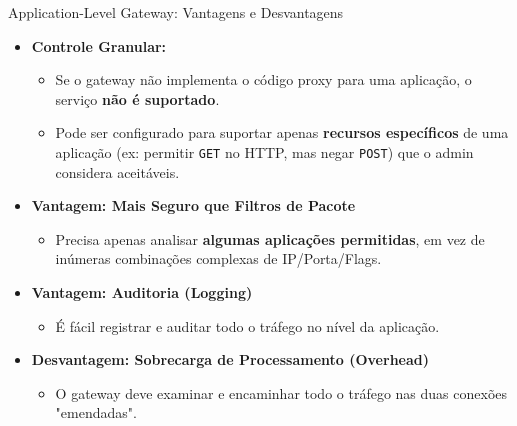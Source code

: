 \begin{frame}{Application-Level Gateway: Vantagens e Desvantagens}
    \begin{itemize}
        \item \textbf{Controle Granular:}
              \begin{itemize}
                  \item Se o gateway não implementa o código proxy para uma aplicação, o serviço \textbf{não é suportado}.
                  \item Pode ser configurado para suportar apenas \textbf{recursos específicos} de uma aplicação (ex: permitir \texttt{GET} no HTTP, mas negar \texttt{POST}) que o admin considera aceitáveis.
              \end{itemize}

        \item \textbf{Vantagem: Mais Seguro que Filtros de Pacote}
              \begin{itemize}
                  \item Precisa apenas analisar \textbf{algumas aplicações permitidas}, em vez de inúmeras combinações complexas de IP/Porta/Flags.
              \end{itemize}

        \item \textbf{Vantagem: Auditoria (Logging)}
              \begin{itemize}
                  \item É fácil registrar e auditar todo o tráfego no nível da aplicação.
              \end{itemize}

        \item \textbf{Desvantagem: Sobrecarga de Processamento (Overhead)}
              \begin{itemize}
                  \item O gateway deve examinar e encaminhar todo o tráfego nas duas conexões "emendadas".
              \end{itemize}
    \end{itemize}
\end{frame}

